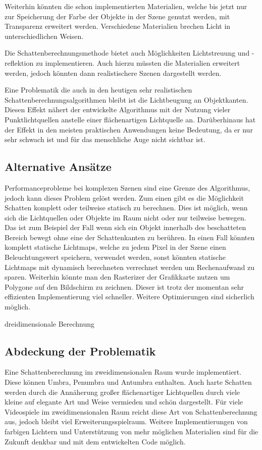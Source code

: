 Weiterhin könnten die schon implementierten Materialien, welche bis jetzt nur zur Speicherung der
Farbe der Objekte in der Szene genutzt werden, mit Transparenz erweitert werden. Verschiedene
Materialien brechen Licht in unterschiedlichen Weisen.

Die Schattenberechnungsmethode bietet auch Möglichkeiten Lichtstreuung und -reflektion zu
implementieren. Auch hierzu müssten die Materialien erweitert werden, jedoch könnten dann
realistischere Szenen dargestellt werden.

Eine Problematik die auch in den heutigen sehr realistischen Schattenberechnungsalgorithmen bleibt
ist die Lichtbeugung an Objektkanten. Diesen Effekt nähert der entwickelte Algorithmus mit der
Nutzung vieler Punktlichtquellen anstelle einer flächenartigen Lichtquelle an. Darüberhinaus hat
der Effekt in den meisten praktischen Anwendungen keine Bedeutung, da er nur sehr schwach ist und
für das menschliche Auge nicht sichtbar ist.

\subsection{Alternative Ansätze}

Performanceprobleme bei komplexen Szenen sind eine Grenze des Algorithmus, jedoch kann dieses Problem
gelöst werden. Zum einen gibt es die Möglichkeit Schatten komplett oder teilweise statisch zu berechnen.
Dies ist möglich, wenn sich die Lichtquellen oder Objekte im Raum nicht oder nur teilweise bewegen. Das
ist zum Beispiel der Fall wenn sich ein Objekt innerhalb des beschatteten Bereich bewegt ohne eine der
Schattenkanten zu berühren.
In einen Fall könnten komplett statische Lichtmaps, welche zu jedem Pixel in der Szene einen
Beleuchtungswert speichern, verwendet werden, sonst könnten statische Lichtmaps mit dynamisch berechneten
verrechnet werden um Rechenaufwand zu sparen. Weiterhin könnte man den Rasterizer der Grafikkarte nutzen
um Polygone auf den Bildschirm zu zeichnen. Dieser ist trotz der momentan sehr effizienten Implementierung
viel schneller. Weitere Optimierungen sind sicherlich möglich.

dreidimensionale Berechnung

\subsection{Abdeckung der Problematik}

Eine Schattenberechnung im zweidimensionalen Raum wurde implementiert. Diese können Umbra, Penumbra und
Antumbra enthalten. Auch harte Schatten werden durch die Annäherung großer flächenartiger Lichtquellen
durch viele kleine auf elegante Art und Weise vermieden und schön dargestellt. Für viele Videospiele im
zweidimensionalen Raum reicht diese Art von Schattenberechnung aus, jedoch bleibt viel
Erweiterungsspielraum. Weitere Implementierungen von farbigen Lichtern und Unterstützung von mehr möglichen
Materialien sind für die Zukunft denkbar und mit dem entwickelten Code möglich.

